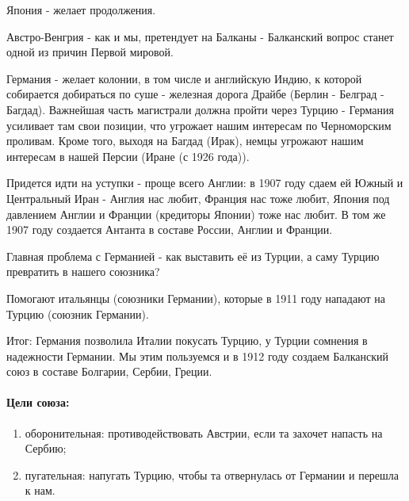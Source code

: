 Япония - желает продолжения.

Австро-Венгрия - как и мы, претендует на Балканы - Балканский вопрос станет одной из причин Первой мировой.

Германия - желает колонии, в том числе и английскую Индию, к которой собирается добираться по суше - железная дорога Драйбе (Берлин - Белград - Багдад). Важнейшая часть магистрали должна пройти через Турцию - Германия усиливает там свои позиции, что угрожает нашим интересам по Черноморским проливам. Кроме того, выходя на Багдад (Ирак), немцы угрожают нашим интересам в нашей Персии (Иране (с 1926 года)).

Придется идти на уступки - проще всего Англии: в 1907 году сдаем ей Южный и Центральный Иран - Англия нас любит, Франция нас тоже любит, Япония под давлением Англии и Франции (кредиторы Японии) тоже нас любит. В том же 1907 году создается Антанта в составе России, Англии и Франции.

Главная проблема с Германией - как выставить её из Турции, а саму Турцию превратить в нашего союзника?

Помогают итальянцы (союзники Германии), которые в 1911 году нападают на Турцию (союзник Германии).

Итог: Германия позволила Италии покусать Турцию, у Турции сомнения в надежности Германии. Мы этим пользуемся и в 1912 году создаем Балканский союз в составе Болгарии, Сербии, Греции. 

\paragraph{Цели союза:}
\begin{enumerate}
	\item оборонительная: противодействовать Австрии, если та захочет напасть на Сербию;
	\item пугательная: напугать Турцию, чтобы та отвернулась от Германии и перешла к нам.
\end{enumerate}